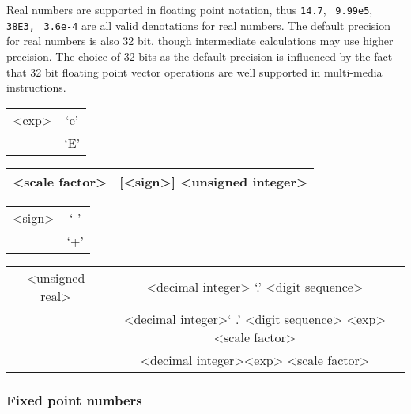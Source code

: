 Real numbers are supported in floating point notation, thus \texttt{14.7}, 
 {\tt \ 9.99e5}, 
{\tt
38E3,} \  {\tt 3.6e-4} are all valid denotations for real numbers. The default
precision for real numbers is also 32 bit, though intermediate calculations
may use higher precision. The choice of 32 bits as the default precision is
influenced by the fact that 32 bit floating point vector operations are well
supported in multi-media instructions.

\vspace{0.3cm}
{\centering \begin{tabular}{|c|c|}
\hline 
<exp>&
`e'\\
&
`E'\\
\hline 
\end{tabular}\par}
\vspace{0.3cm}

\vspace{0.3cm}
{\centering \begin{tabular}{|c|c|}
\hline 
<scale factor>&
{[}<sign>{]} <unsigned integer>\\
\hline 
\end{tabular}\par}
\vspace{0.3cm}

\vspace{0.3cm}
{\centering \begin{tabular}{|c|c|}
\hline 
<sign>&
`-'\\
&
`+'\\
\hline 
\end{tabular}\par}
\vspace{0.3cm}

\vspace{0.3cm}
{\centering \begin{tabular}{|c|c|}
\hline 
<unsigned real>&
<decimal integer> `.' <digit sequence>\\
&
<decimal integer>` .' <digit sequence> <exp><scale factor> \\
&
<decimal integer><exp> <scale factor>\\
\hline 
\end{tabular}\par}
\vspace{0.3cm}


\subsubsection{Fixed point numbers}

